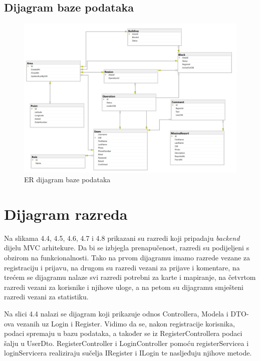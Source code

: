 			\subsection{Dijagram baze podataka}
				\begin{figure}[H]
					\includegraphics[width=15cm]{./slike/ERDijagram.png}
					 \centering
					 \caption{ER dijagram baze podataka}
				\end{figure}
			\eject
			
			
		\section{Dijagram razreda}
		
		Na slikama 4.4, 4.5, 4.6, 4.7 i 4.8 prikazani su razredi koji pripadaju \textit{backend} dijelu MVC arhitekure. Da bi se izbjegla prenapučenost, razredi su podijeljeni s obzirom na funkcionalnosti. Tako na prvom dijagramu imamo razrede vezane za registraciju i prijavu, na drugom su razredi vezani za prijave i komentare, na trećem se dijagramu nalaze svi razredi potrebni za karte i mapiranje, na četvrtom razredi vezani za korisnike i njihove uloge, a na petom su dijagramu smješteni razredi vezani za statistiku.
		
		Na slici 4.4 nalazi se dijagram koji prikazuje odnos Controllera, Modela i DTO-ova vezanih uz Login i Register. Vidimo da se, nakon registracije korisnika, podaci spremaju u bazu podataka, a također se iz RegisterControllera podaci šalju u UserDto. RegisterController i LoginController pomoću registerServicea i loginServicera realiziraju sučelja IRegister i ILogin te nasljeđuju njihove metode.
								
